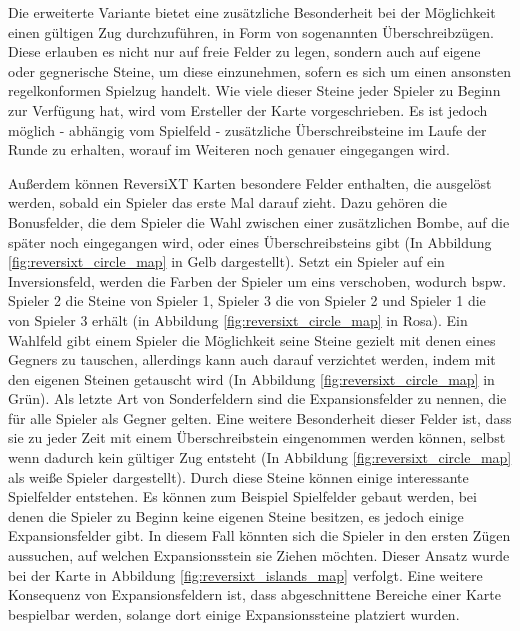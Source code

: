 \documentclass[12pt,a4paper,bibliography=totocnumbered,listof=totocnumbered]{article}
\begin{document}
Die erweiterte Variante bietet eine zusätzliche Besonderheit bei der Möglichkeit einen gültigen Zug durchzuführen, in Form von sogenannten Überschreibzügen. Diese erlauben es nicht nur auf freie Felder zu legen, sondern auch auf eigene oder gegnerische Steine, um diese einzunehmen, sofern es sich um einen ansonsten regelkonformen Spielzug handelt. Wie viele dieser Steine jeder Spieler zu Beginn zur Verfügung hat, wird vom Ersteller der Karte vorgeschrieben. Es ist jedoch möglich - abhängig vom Spielfeld - zusätzliche Überschreibsteine im Laufe der Runde zu erhalten, worauf im Weiteren noch genauer eingegangen wird. 

Außerdem können ReversiXT Karten besondere Felder enthalten, die ausgelöst werden, sobald ein Spieler das erste Mal darauf zieht. Dazu gehören die Bonusfelder, die dem Spieler die Wahl zwischen einer zusätzlichen Bombe, auf die später noch eingegangen wird, oder eines Überschreibsteins gibt (In Abbildung \ref{fig:reversixt_circle_map} in Gelb dargestellt). Setzt ein Spieler auf ein Inversionsfeld, werden die Farben der Spieler um eins verschoben, wodurch bspw. Spieler 2 die Steine von Spieler 1, Spieler 3 die von Spieler 2 und Spieler 1 die von Spieler 3 erhält (in Abbildung \ref{fig:reversixt_circle_map} in Rosa). Ein Wahlfeld gibt einem Spieler die Möglichkeit seine Steine gezielt mit denen eines Gegners zu tauschen, allerdings kann auch darauf verzichtet werden, indem mit den eigenen Steinen \glqq getauscht\grqq{} wird (In Abbildung \ref{fig:reversixt_circle_map} in Grün). Als letzte Art von Sonderfeldern sind die Expansionsfelder zu nennen, die für alle Spieler als Gegner gelten. Eine weitere Besonderheit dieser Felder ist, dass sie zu jeder Zeit mit einem Überschreibstein eingenommen werden können, selbst wenn dadurch kein gültiger Zug entsteht (In Abbildung \ref{fig:reversixt_circle_map} als weiße Spieler dargestellt). Durch diese Steine können einige interessante Spielfelder entstehen. Es können zum Beispiel Spielfelder gebaut werden, bei denen die Spieler zu Beginn keine eigenen Steine besitzen, es jedoch einige Expansionsfelder gibt. In diesem Fall könnten sich die Spieler in den ersten Zügen aussuchen, auf welchen Expansionsstein sie Ziehen möchten. Dieser Ansatz wurde bei der Karte in Abbildung \ref{fig:reversixt_islands_map} verfolgt. Eine weitere Konsequenz von Expansionsfeldern ist, dass abgeschnittene Bereiche einer Karte bespielbar werden, solange dort einige Expansionssteine platziert wurden.
\end{document}

